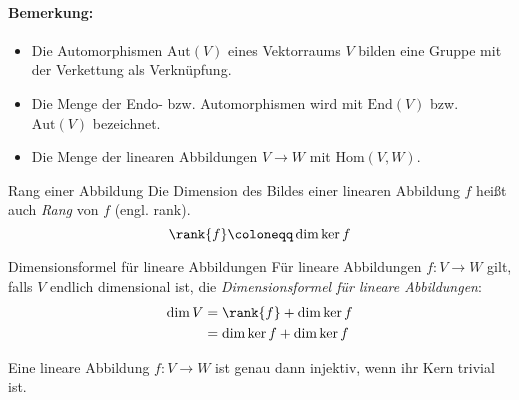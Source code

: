 \paragraph{Bemerkung:}
\begin{itemize}
	\item Die Automorphismen $\mathrm{Aut}(V)$ eines Vektorraums $V$ bilden eine Gruppe mit der Verkettung als Verknüpfung.
	\item Die Menge der Endo- bzw. Automorphismen wird mit $\mathrm{End}(V)$ bzw. $\mathrm{Aut}(V)$ bezeichnet.
	\item Die Menge der linearen Abbildungen $V\rightarrow W$ mit $\mathrm{Hom}(V,W)$.
\end{itemize}


\begin{definition}{Rang einer Abbildung}
  Die Dimension des Bildes einer linearen Abbildung $f$ heißt auch \emph{Rang} von $f$ (engl. rank).
  \begin{equation*}
    \rank{f} \coloneqq \dim{\ker f}
  \end{equation*}
\end{definition}

\begin{satz}{Dimensionsformel für lineare Abbildungen}
  Für lineare Abbildungen $f:V\rightarrow W$ gilt, falls $V$ endlich dimensional ist, die \emph{Dimensionsformel für lineare Abbildungen}:
  \begin{align*}
    \dim{V}&=\rank{f}+\dim{\ker f}\\
    &=\dim{\ker f}+\dim{\ker f}
  \end{align*}
\end{satz}

\begin{lemma}{}
  Eine lineare Abbildung $f:V\rightarrow W$ ist genau dann injektiv, wenn ihr Kern trivial ist.
\end{lemma}
